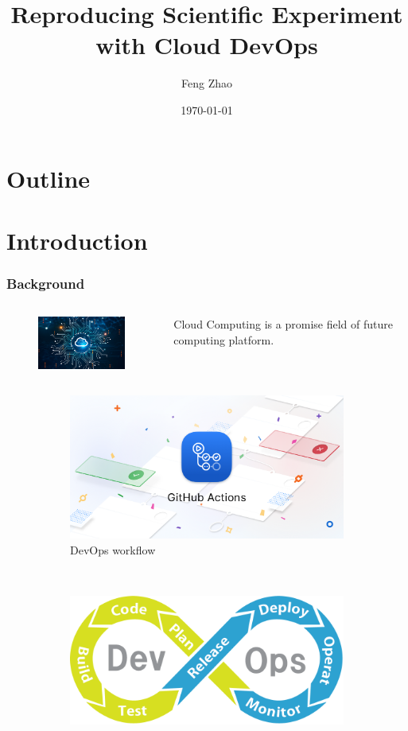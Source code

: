 \documentclass[notheorems]{beamer}
\title{Reproducing Scientific Experiment with Cloud DevOps}
\author{Feng Zhao}
\date{\today}
\begin{document}
\begin{frame}
	\titlepage
\end{frame}
\section*{Outline}
\begin{frame}
	\tableofcontents
\end{frame}

\section{Introduction}
\begin{frame}
\frametitle{Background}
	\begin{columns}
		\column{5cm}
		\begin{figure}
			\includegraphics[width=4cm]{pic/cloud_computing.png}
		\end{figure}
		\column{5cm}
	Cloud Computing is 	a promise field of future computing platform.
		\end{columns}
\begin{figure}
	\centering
	\begin{subfigure}{0.4\textwidth}
		\includegraphics[width=\textwidth]{pic/github_actions.png}
		\caption{DevOps workflow}
	\end{subfigure}~~~~~
	\begin{subfigure}{0.4\textwidth}
		\includegraphics[width=\textwidth]{pic/general_workflow.png}

\end{subfigure}
\end{figure}
\end{frame}
\end{document}
